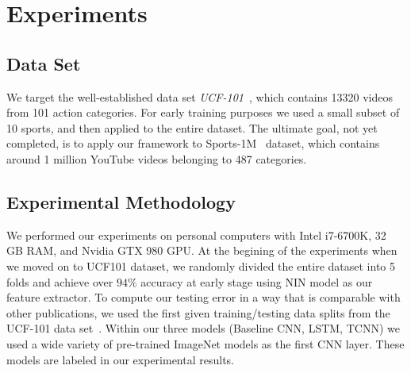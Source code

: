 \section{Experiments}
\subsection{Data Set}
We target the well-established data set \emph{UCF-101}~\cite{ucf101}, which contains 13320 videos from 101 action categories. For early training purposes we used a small subset of 10 sports, and then applied to the entire dataset. The ultimate goal, not yet completed, is to apply our framework to Sports-1M~\cite{cnnvid} dataset, which contains around 1 million YouTube videos belonging to 487 categories.

\subsection{Experimental Methodology}
We performed our experiments on personal computers with Intel i7-6700K, 32 GB RAM, and Nvidia GTX 980 GPU. At the begining of the experiments when we moved on to UCF101 dataset, we randomly divided the entire dataset into 5 folds and achieve over $94\%$ accuracy at early stage using NIN model as our feature extractor. 
To compute our testing error in a way that is comparable with other publications, we used the first given training/testing data splits from the UCF-101 data set~\cite{ucf101}. Within our three models (Baseline CNN, LSTM, TCNN) we used a wide variety of pre-trained ImageNet models as the first CNN layer. These models are labeled in our experimental results. 


